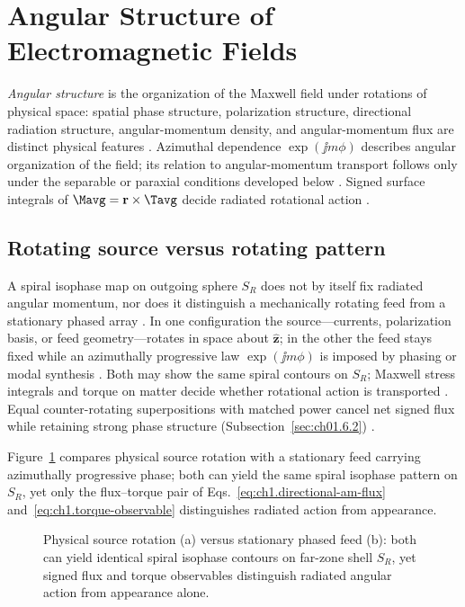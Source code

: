 \section{Angular Structure of Electromagnetic Fields}
\label{sec:ch01.2}

\emph{Angular structure} is the organization of the Maxwell field under rotations of physical space: spatial phase structure, polarization structure, directional radiation structure, angular-momentum density, and angular-momentum flux are distinct physical features \cite{belinfante1940,poynting1884}. Azimuthal dependence $\exp(\jj m\phi)$ describes angular organization of the field; its relation to angular-momentum transport follows only under the separable or paraxial conditions developed below \cite{allen1992,stratton1941}. Signed surface integrals of $\Mavg=\mathbf{r}\times\Tavg$ decide radiated rotational action \cite{beth1936}.
\subsection{Rotating source versus rotating pattern}
\label{sec:ch01.2.0}

A spiral isophase map on outgoing sphere $S_R$ does not by itself fix radiated angular momentum, nor does it distinguish a mechanically rotating feed from a stationary phased array \cite{beth1936}. In one configuration the source---currents, polarization basis, or feed geometry---rotates in space about \(\hat{\mathbf{z}}\); in the other the feed stays fixed while an azimuthally progressive law \(\exp(\jj m\phi)\) is imposed by phasing or modal synthesis \cite{harrington2001}. Both may show the same spiral contours on $S_R$; Maxwell stress integrals and torque on matter decide whether rotational action is transported \cite{beth1936,stratton1941}. Equal counter-rotating superpositions with matched power cancel net signed flux while retaining strong phase structure (Subsection~\ref{sec:ch01.6.2}) \cite{allen1992}.

Figure~\ref{fig:ch1.signature-rotation-duality} compares physical source rotation with a stationary feed carrying azimuthally progressive phase; both can yield the same spiral isophase pattern on \(S_R\), yet only the flux--torque pair of Eqs.~\eqref{eq:ch1.directional-am-flux} and~\eqref{eq:ch1.torque-observable} distinguishes radiated action from appearance.

\begin{figure}[t]
\centering
\VolIPhysFig{\VolIPhysRotationDuality}
\caption{Physical source rotation (a) versus stationary phased feed (b): both can yield identical spiral isophase contours on far-zone shell $S_R$, yet signed flux and torque observables distinguish radiated angular action from appearance alone.}
\label{fig:ch1.signature-rotation-duality}
\end{figure}


